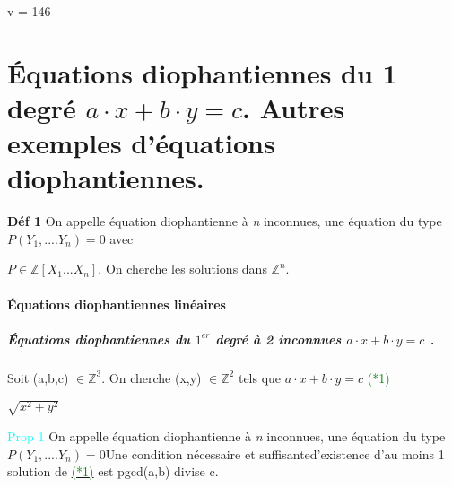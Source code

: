 \documentclass{article}
\begin{document}

v = 146

\part{Équations diophantiennes du
  1\ier{}  degré $a \cdot x+b \cdot y=c$. Autres exemples d'équations diophantiennes.}


\textbf{Déf 1}
On appelle équation diophantienne à \textit{n} inconnues, une équation du type $P(Y_{1},....Y_{n})=0$ avec

$P \in \mathbb{Z}[X_{1}...X_{n}]$. On cherche les solutions dans $\mathbb{Z}^{n}$.
\subsection{Équations diophantiennes linéaires}


\subsubsection{Équations diophantiennes du $1^{er}$ degré à 2 inconnues $a \cdot x+b \cdot y=c$ .}

Soit (a,b,c) $\in \mathbb{Z}^3$. On cherche (x,y) $\in \mathbb{Z}^2$  tels que  $a \cdot x + b \cdot y = c$ 
\hypertarget{here2}{\textcolor{green}{(*1)} }


$\sqrt{x^2+y^2}$

\textcolor{cyan}{Prop 1}
On appelle équation diophantienne à \textit{n} inconnues, une équation du type $P(Y_{1},....Y_{n})=0$Une condition nécessaire et suffisanted'existence d'au moins 1 solution de    \hyperlink{here2}{\textcolor{green}{(*1)}}
est pgcd(a,b) divise c.
\end{document}
